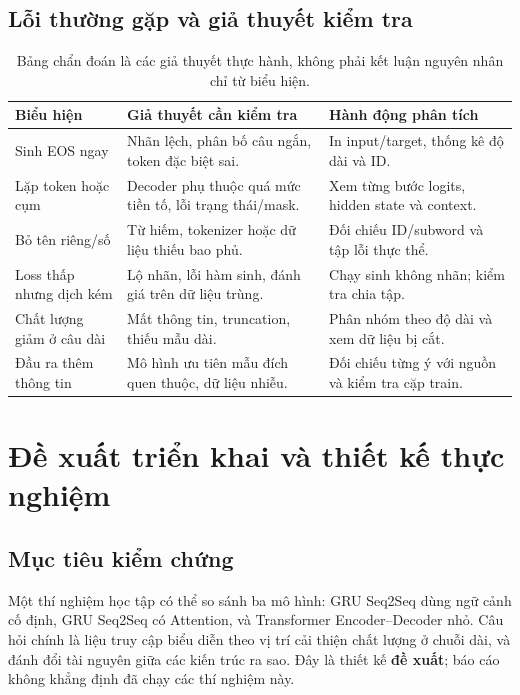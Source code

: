 \documentclass[11pt,a4paper]{article}
\numberwithin{equation}{section}
\begin{document}
\subsection{Lỗi thường gặp và giả thuyết kiểm tra}
\begin{table}[H]
\centering\small
\begin{tabularx}{\linewidth}{@{}p{3.3cm}YY@{}}
\toprule{}Biểu hiện & Giả thuyết cần kiểm tra & Hành động phân tích\\\midrule
Sinh EOS ngay & Nhãn lệch, phân bố câu ngắn, token đặc biệt sai. & In input/target, thống kê độ dài và ID.\\
Lặp token hoặc cụm & Decoder phụ thuộc quá mức tiền tố, lỗi trạng thái/mask. & Xem từng bước logits, hidden state và context.\\
Bỏ tên riêng/số & Từ hiếm, tokenizer hoặc dữ liệu thiếu bao phủ. & Đối chiếu ID/subword và tập lỗi thực thể.\\
Loss thấp nhưng dịch kém & Lộ nhãn, lỗi hàm sinh, đánh giá trên dữ liệu trùng. & Chạy sinh không nhãn; kiểm tra chia tập.\\
Chất lượng giảm ở câu dài & Mất thông tin, truncation, thiếu mẫu dài. & Phân nhóm theo độ dài và xem dữ liệu bị cắt.\\
Đầu ra thêm thông tin & Mô hình ưu tiên mẫu đích quen thuộc, dữ liệu nhiễu. & Đối chiếu từng ý với nguồn và kiểm tra cặp train.\\
\bottomrule
\end{tabularx}
\caption{Bảng chẩn đoán là các giả thuyết thực hành, không phải kết luận nguyên nhân chỉ từ biểu hiện.}
\end{table}

\section{Đề xuất triển khai và thiết kế thực nghiệm}
\subsection{Mục tiêu kiểm chứng}
Một thí nghiệm học tập có thể so sánh ba mô hình: GRU Seq2Seq dùng ngữ cảnh cố định, GRU Seq2Seq có Attention, và Transformer Encoder--Decoder nhỏ. Câu hỏi chính là liệu truy cập biểu diễn theo vị trí cải thiện chất lượng ở chuỗi dài, và đánh đổi tài nguyên giữa các kiến trúc ra sao. Đây là thiết kế \textbf{đề xuất}; báo cáo không khẳng định đã chạy các thí nghiệm này.
\end{document}
